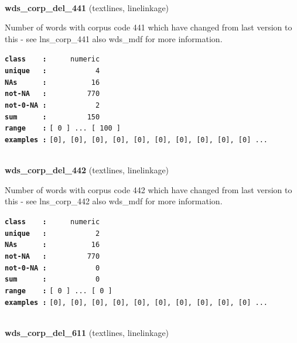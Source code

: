 \documentclass[]{article}
\begin{document}
~

\textbf{wds\_corp\_del\_441} (textlines, linelinkage)

Number of words with corpus code 441 which have changed from last
version to this - see lns\_corp\_441 also wds\_mdf for more information.

\textbf{\texttt{class\ \ \ \ :}} \texttt{~~~~~numeric}\\
\textbf{\texttt{unique\ \ \ :}} \texttt{~~~~~~~~~~~4}\\
\textbf{\texttt{NAs\ \ \ \ \ \ :}} \texttt{~~~~~~~~~~16}\\
\textbf{\texttt{not-NA\ \ \ :}} \texttt{~~~~~~~~~770}\\
\textbf{\texttt{not-0-NA\ :}} \texttt{~~~~~~~~~~~2}\\
\textbf{\texttt{sum\ \ \ \ \ \ :}} \texttt{~~~~~~~~~150}\\
\textbf{\texttt{range\ \ \ \ :}}
\texttt{{[}\ 0\ {]}\ ...\ {[}\ 100\ {]}}\\
\textbf{\texttt{examples\ :}}
\texttt{{[}0{]},\ {[}0{]},\ {[}0{]},\ {[}0{]},\ {[}0{]},\ {[}0{]},\ {[}0{]},\ {[}0{]},\ {[}0{]},\ {[}0{]}\ ...}\\

~

\textbf{wds\_corp\_del\_442} (textlines, linelinkage)

Number of words with corpus code 442 which have changed from last
version to this - see lns\_corp\_442 also wds\_mdf for more information.

\textbf{\texttt{class\ \ \ \ :}} \texttt{~~~~~numeric}\\
\textbf{\texttt{unique\ \ \ :}} \texttt{~~~~~~~~~~~2}\\
\textbf{\texttt{NAs\ \ \ \ \ \ :}} \texttt{~~~~~~~~~~16}\\
\textbf{\texttt{not-NA\ \ \ :}} \texttt{~~~~~~~~~770}\\
\textbf{\texttt{not-0-NA\ :}} \texttt{~~~~~~~~~~~0}\\
\textbf{\texttt{sum\ \ \ \ \ \ :}} \texttt{~~~~~~~~~~~0}\\
\textbf{\texttt{range\ \ \ \ :}}
\texttt{{[}\ 0\ {]}\ ...\ {[}\ 0\ {]}}\\
\textbf{\texttt{examples\ :}}
\texttt{{[}0{]},\ {[}0{]},\ {[}0{]},\ {[}0{]},\ {[}0{]},\ {[}0{]},\ {[}0{]},\ {[}0{]},\ {[}0{]},\ {[}0{]}\ ...}\\

~

\textbf{wds\_corp\_del\_611} (textlines, linelinkage)
\end{document}

